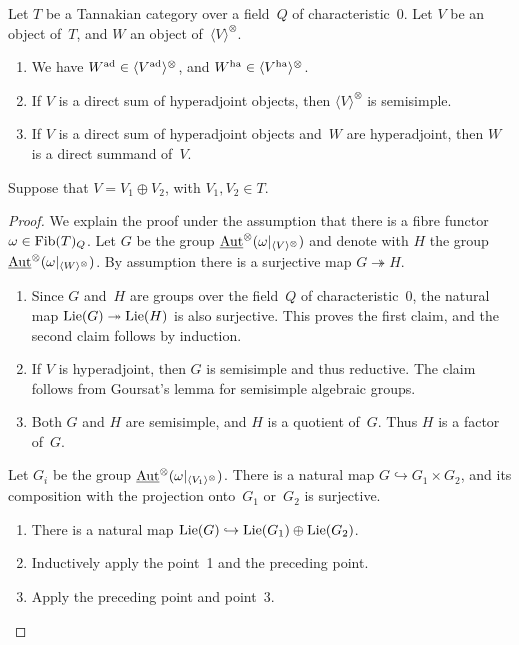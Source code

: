 \documentclass[10pt,twoside,leqno]{article}
\numberwithin{equation}{subsection}
\newcommand{\into}{\hookrightarrow}
\newcommand{\onto}{\twoheadrightarrow}
\newcommand{\Aut}{\textnormal{Aut}}
\newcommand{\iAut}{\underline{\Aut}}
\newcommand{\ZZ}{\mathbb{Z}}
\newcommand{\Lie}{\textnormal{Lie}}
\newcommand{\ad}{\textnormal{ad}}
\newcommand{\ha}{\textnormal{ha}}
\newcommand{\Fib}{\textnormal{Fib}}
\newcommand{\Tangen}[1]{\langle #1 \rangle^{\otimes}}
\begin{document}
\begin{lemma} %
 \label{ha-props}
 Let $T$ be a Tannakian category over a field~$Q$ of characteristic~$0$.
 Let $V$ be an object of~$T$, and $W$ an object of~$\Tangen{V}$.
 \begin{enumerate}
  \item We have $W^\ad \in \Tangen{V^\ad}$, and $W^\ha \in \Tangen{V^\ha}$.
  \item If $V$ is a direct sum of hyperadjoint objects,
   then $\Tangen{V}$ is semisimple.
  \item If $V$ is a direct sum of hyperadjoint objects
   and~$W$ are hyperadjoint, then $W$ is a direct summand of~$V$.
 \end{enumerate}
  Suppose that $V = V_1 \oplus V_2$, with $V_1,V_2 \in T$.
 \begin{proof}
  We explain the proof under the assumption
  that there is a fibre functor $\omega \in \Fib(T)_Q$.
  Let $G$ be the group $\iAut^\otimes(\omega|_{\Tangen{V}})$
  and denote with $H$ the group $\iAut^\otimes(\omega|_{\Tangen{W}})$.
  By assumption there is a surjective map $G \onto H$.
  \begin{enumerate}
   \item Since $G$ and~$H$ are groups over the field~$Q$ of characteristic~$0$,
    the natural map $\Lie(G) \onto \Lie(H)$ is also surjective.
    This proves the first claim, and the second claim follows by induction.
   \item If $V$ is hyperadjoint, then $G$ is semisimple and thus reductive.
    The claim follows from Goursat's lemma for semisimple algebraic groups.
   \item Both $G$ and $H$ are semisimple, and $H$ is a quotient of~$G$.
    Thus $H$ is a factor of~$G$.
  \end{enumerate}
  Let $G_i$ be the group $\iAut^\otimes(\omega|_{\Tangen{V_1}})$.
  There is a natural map $G \into G_1 \times G_2$,
  and its composition with the projection onto~$G_1$ or~$G_2$ is surjective.
  \begin{enumerate}[resume]
   \item There is a natural map $\Lie(G) \into \Lie(G_1) \oplus \Lie(G_2)$.
   \item Inductively apply the point~1 and the preceding point.
   \item Apply the preceding point and point~3.
  \end{enumerate}
 \end{proof}
\end{lemma}
\end{document}

